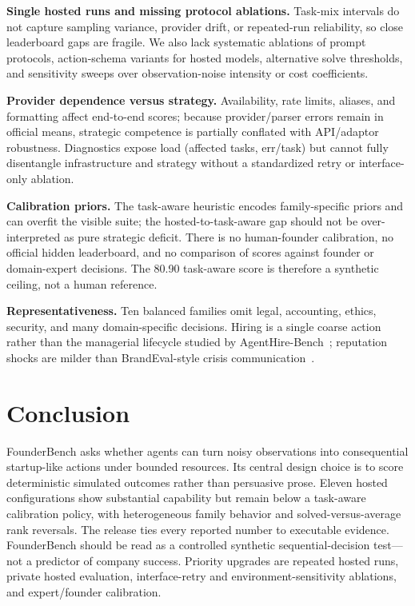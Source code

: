 \documentclass[sigconf,review]{acmart}
\begin{document}
\textbf{Single hosted runs and missing protocol ablations.}
Task-mix intervals do not capture sampling variance, provider drift, or repeated-run reliability, so close leaderboard gaps are fragile.
We also lack systematic ablations of prompt protocols, action-schema variants for hosted models, alternative solve thresholds, and sensitivity sweeps over observation-noise intensity or cost coefficients.

\textbf{Provider dependence versus strategy.}
Availability, rate limits, aliases, and formatting affect end-to-end scores; because provider/parser errors remain in official means, strategic competence is partially conflated with API/adaptor robustness.
Diagnostics expose load (affected tasks, err/task) but cannot fully disentangle infrastructure and strategy without a standardized retry or interface-only ablation.

\textbf{Calibration priors.}
The task-aware heuristic encodes family-specific priors and can overfit the visible suite; the hosted-to-task-aware gap should not be over-interpreted as pure strategic deficit.
There is no human-founder calibration, no official hidden leaderboard, and no comparison of scores against founder or domain-expert decisions.
The 80.90 task-aware score is therefore a synthetic ceiling, not a human reference.

\textbf{Representativeness.}
Ten balanced families omit legal, accounting, ethics, security, and many domain-specific decisions.
Hiring is a single coarse action rather than the managerial lifecycle studied by AgentHire-Bench~\cite{agenthire2026}; reputation shocks are milder than BrandEval-style crisis communication~\cite{brandeval2026}.

\section{Conclusion}
FounderBench asks whether agents can turn noisy observations into consequential startup-like actions under bounded resources.
Its central design choice is to score deterministic simulated outcomes rather than persuasive prose.
Eleven hosted configurations show substantial capability but remain below a task-aware calibration policy, with heterogeneous family behavior and solved-versus-average rank reversals.
The release ties every reported number to executable evidence.
FounderBench should be read as a controlled synthetic sequential-decision test---not a predictor of company success.
Priority upgrades are repeated hosted runs, private hosted evaluation, interface-retry and environment-sensitivity ablations, and expert/founder calibration.



\end{document}
